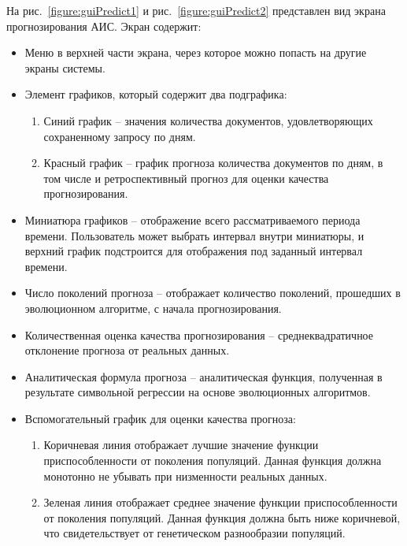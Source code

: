 На рис.~\ref{figure:guiPredict1} и рис.~\ref{figure:guiPredict2} представлен вид экрана прогнозирования АИС. Экран содержит:
\begin{itemize}
\item Меню в верхней части экрана, через которое можно попасть на другие экраны системы.
\item Элемент графиков, который содержит два подграфика:
\begin{enumerate}
  \item Синий график -- значения количества документов, удовлетворяющих сохраненному запросу по дням. 
  \item Красный график -- график прогноза количества документов по дням, в том числе и ретроспективный прогноз для оценки качества прогнозирования.
\end{enumerate}
\item Миниатюра графиков -- отображение всего рассматриваемого периода времени. Пользователь может выбрать интервал внутри миниатюры, и верхний график подстроится для отображения под заданный интервал времени.
\item Число поколений прогноза -- отображает количество поколений, прошедших в эволюционном алгоритме, с начала прогнозирования.
\item Количественная оценка качества прогнозирования -- среднеквадратичное отклонение прогноза от реальных данных.
\item Аналитическая формула прогноза -- аналитическая функция, полученная в результате символьной регрессии на основе эволюционных алгоритмов.
\item Вспомогательный график для оценки качества прогноза:
\begin{enumerate}
\item Коричневая линия отображает лучшие значение функции приспособленности от поколения популяций. Данная функция должна монотонно не убывать при низменности реальных данных.
\item Зеленая линия отображает среднее значение функции приспособленности от поколения популяций. Данная функция должна быть ниже коричневой, что свидетельствует от генетическом разнообразии популяций.
\end{enumerate}
\end{itemize}
